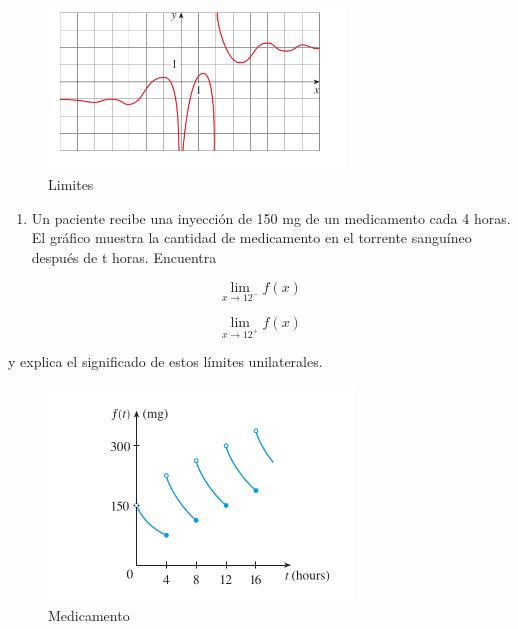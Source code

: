\documentclass[
]{article}
\providecommand{\tightlist}{%
  \setlength{\itemsep}{0pt}\setlength{\parskip}{0pt}}\usepackage{longtable,booktabs,array}
\begin{document}
\begin{figure}[H]

{\centering \includegraphics[width=0.7\textwidth,height=\textheight]{figures/limi_funtion.png}

}

\caption{Limites}

\end{figure}%

\begin{enumerate}
\def\labelenumi{\arabic{enumi}.}
\setcounter{enumi}{4}
\tightlist
\item
  Un paciente recibe una inyección de 150 mg de un medicamento cada 4
  horas. El gráfico muestra la cantidad de medicamento en el torrente
  sanguíneo después de t horas. Encuentra
\end{enumerate}

\[\lim_{x\to 12^-}f(x)\]

\[\lim_{x\to 12^+}f(x)\]

y explica el significado de estos límites unilaterales.

\begin{figure}[H]

{\centering \includegraphics{figures/medicene.png}

}

\caption{Medicamento}

\end{figure}%
\end{document}
